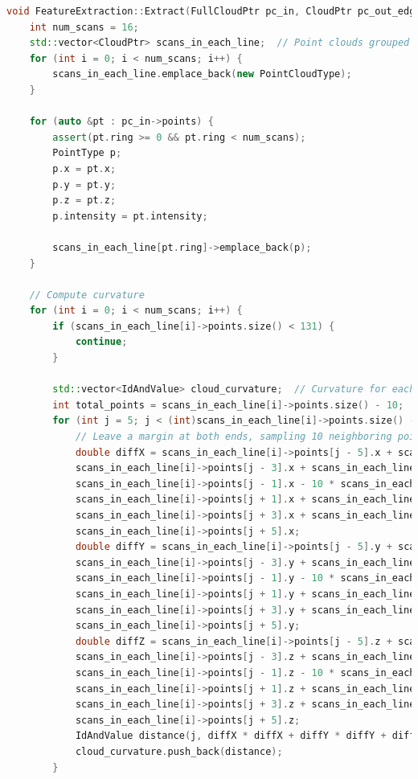 \begin{lstlisting}[language=c++,caption=src/ch7/loam\_like/feature\_extraction.cc]  
void FeatureExtraction::Extract(FullCloudPtr pc_in, CloudPtr pc_out_edge, CloudPtr pc_out_surf) {  
	int num_scans = 16;  
	std::vector<CloudPtr> scans_in_each_line;  // Point clouds grouped by beam  
	for (int i = 0; i < num_scans; i++) {  
		scans_in_each_line.emplace_back(new PointCloudType);  
	}  
	
	for (auto &pt : pc_in->points) {  
		assert(pt.ring >= 0 && pt.ring < num_scans);  
		PointType p;  
		p.x = pt.x;  
		p.y = pt.y;  
		p.z = pt.z;  
		p.intensity = pt.intensity;  
		
		scans_in_each_line[pt.ring]->emplace_back(p);  
	}  
	
	// Compute curvature  
	for (int i = 0; i < num_scans; i++) {  
		if (scans_in_each_line[i]->points.size() < 131) {  
			continue;  
		}  
		
		std::vector<IdAndValue> cloud_curvature;  // Curvature for each beam  
		int total_points = scans_in_each_line[i]->points.size() - 10;  
		for (int j = 5; j < (int)scans_in_each_line[i]->points.size() - 5; j++) {  
			// Leave a margin at both ends, sampling 10 neighboring points for averaging  
			double diffX = scans_in_each_line[i]->points[j - 5].x + scans_in_each_line[i]->points[j - 4].x +  
			scans_in_each_line[i]->points[j - 3].x + scans_in_each_line[i]->points[j - 2].x +  
			scans_in_each_line[i]->points[j - 1].x - 10 * scans_in_each_line[i]->points[j].x +  
			scans_in_each_line[i]->points[j + 1].x + scans_in_each_line[i]->points[j + 2].x +  
			scans_in_each_line[i]->points[j + 3].x + scans_in_each_line[i]->points[j + 4].x +  
			scans_in_each_line[i]->points[j + 5].x;  
			double diffY = scans_in_each_line[i]->points[j - 5].y + scans_in_each_line[i]->points[j - 4].y +  
			scans_in_each_line[i]->points[j - 3].y + scans_in_each_line[i]->points[j - 2].y +  
			scans_in_each_line[i]->points[j - 1].y - 10 * scans_in_each_line[i]->points[j].y +  
			scans_in_each_line[i]->points[j + 1].y + scans_in_each_line[i]->points[j + 2].y +  
			scans_in_each_line[i]->points[j + 3].y + scans_in_each_line[i]->points[j + 4].y +  
			scans_in_each_line[i]->points[j + 5].y;  
			double diffZ = scans_in_each_line[i]->points[j - 5].z + scans_in_each_line[i]->points[j - 4].z +  
			scans_in_each_line[i]->points[j - 3].z + scans_in_each_line[i]->points[j - 2].z +  
			scans_in_each_line[i]->points[j - 1].z - 10 * scans_in_each_line[i]->points[j].z +  
			scans_in_each_line[i]->points[j + 1].z + scans_in_each_line[i]->points[j + 2].z +  
			scans_in_each_line[i]->points[j + 3].z + scans_in_each_line[i]->points[j + 4].z +  
			scans_in_each_line[i]->points[j + 5].z;  
			IdAndValue distance(j, diffX * diffX + diffY * diffY + diffZ * diffZ);  
			cloud_curvature.push_back(distance);  
		}  
		

\end{lstlisting}
